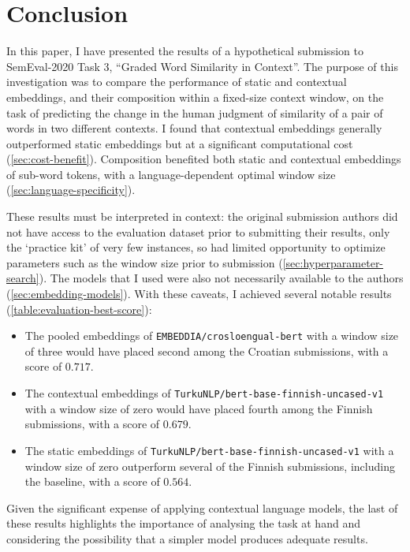 \section{Conclusion}
\label{sec:conclusion}

In this paper, I have presented the results of a hypothetical submission to
SemEval-2020 Task 3, ``Graded Word Similarity in Context''.
The purpose of this investigation was to compare the performance of static and
contextual embeddings, and their composition within a fixed-size context window, on the
task of predicting the change in the human judgment of similarity of a pair of words in
two different contexts.
I found that contextual embeddings generally outperformed static embeddings but at a
significant computational cost (\cref{sec:cost-benefit}).
Composition benefited both static and contextual embeddings of sub-word tokens, with a
language-dependent optimal window size (\cref{sec:language-specificity}).

These results must be interpreted in context: the original submission authors did not
have access to the evaluation dataset prior to submitting their results, only the
`practice kit' of very few instances, so had limited opportunity to optimize parameters
such as the window size prior to submission (\cref{sec:hyperparameter-search}).
The models that I used were also not necessarily available to the authors
(\cref{sec:embedding-models}).
With these caveats, I achieved several notable results (\cref{table:evaluation-best-score}):
\begin{itemize}
  \item The pooled embeddings of \texttt{EMBEDDIA/crosloengual-bert} with a window
        size of three would have placed second among the Croatian submissions, with a
        score of $0.717$.
  \item The contextual embeddings of \texttt{TurkuNLP/bert-base-finnish-uncased-v1}
        with a window size of zero would have placed fourth among the Finnish
        submissions, with a score of $0.679$.
  \item The static embeddings of \texttt{TurkuNLP/bert-base-finnish-uncased-v1}
        with a window size of zero outperform several of the Finnish submissions,
        including the baseline, with a score of $0.564$.
\end{itemize}
Given the significant expense of applying contextual language models, the last of these
results highlights the importance of analysing the task at hand and considering the
possibility that a simpler model produces adequate results.
